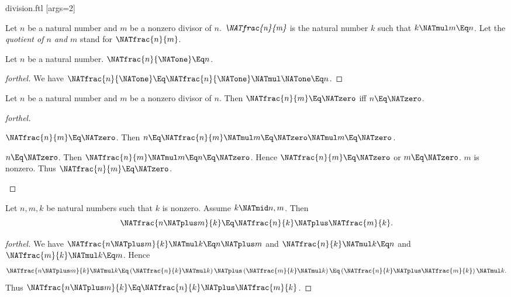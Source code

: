 \documentclass{stex}
\begin{document}
\begin{smodule}{division.ftl}
[args=2]{}

\begin{definition}[forthel,for=quotient]
  Let $n$ be a natural number and $m$ be a nonzero divisor of $n$.
  $\emph{\NATfrac{n}{m}}$ is the natural number $k$ such that $k \NATmul m \Eq n$.
  Let the \emph{quotient of $n$ and $m$} stand for $\NATfrac{n}{m}$.
\end{definition}

\begin{proposition}[forthel]
  Let $n$ be a natural number.
  $\NATfrac{n}{\NATone} \Eq n$.
\end{proposition}
\begin{proof}[forthel]
  We have $\NATfrac{n}{\NATone}
    \Eq \NATfrac{n}{\NATone} \NATmul \NATone
    \Eq n$.
\end{proof}

\begin{proposition}[forthel]
  Let $n$ be a natural number and $m$ be a nonzero divisor of $n$.
  Then $\NATfrac{n}{m} \Eq \NATzero$ iff $n \Eq \NATzero$.
\end{proposition}
\begin{proof}[forthel]
  \begin{case}{$\NATfrac{n}{m} \Eq \NATzero$.}
    Then $n
      \Eq \NATfrac{n}{m} \NATmul m
      \Eq \NATzero \NATmul m
      \Eq \NATzero$.
  \end{case}

  \begin{case}{$n \Eq \NATzero$.}
    Then $\NATfrac{n}{m} \NATmul m
      \Eq n
      \Eq \NATzero$.
    Hence $\NATfrac{n}{m} \Eq \NATzero$ or $m \Eq \NATzero$.
    $m$ is nonzero.
    Thus $\NATfrac{n}{m} \Eq \NATzero$.
  \end{case}
\end{proof}

\begin{proposition}[forthel]
  Let $n, m, k$ be natural numbers such that $k$ is nonzero.
  Assume $k \NATmid n,m$.
  Then \[\NATfrac{n \NATplus m}{k} \Eq \NATfrac{n}{k} \NATplus \NATfrac{m}{k}.\]
\end{proposition}
\begin{proof}[forthel]
  We have $\NATfrac{n \NATplus m}{k} \NATmul k \Eq n \NATplus m$ and $\NATfrac{n}{k} \NATmul k \Eq n$ and $\NATfrac{m}{k} \NATmul k \Eq m$.
  Hence
  \[  \NATfrac{n \NATplus m}{k} \NATmul k
      \Eq \left( \NATfrac{n}{k} \NATmul k \right) \NATplus \left( \NATfrac{m}{k} \NATmul k \right)
      \Eq \left( \NATfrac{n}{k} \NATplus \NATfrac{m}{k} \right) \NATmul k. \]
  Thus $\NATfrac{n \NATplus m}{k} \Eq \NATfrac{n}{k} \NATplus \NATfrac{m}{k}$.
\end{proof}


\end{smodule}
\end{document}
